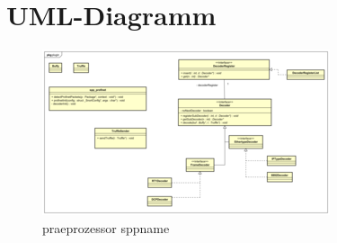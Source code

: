 \section{UML-Diagramm}

\begin{figure}
  \centering
  \includegraphics[width=\paperwidth]{../diagramimages/spp_profinet.png}
  \caption{\gls{praeprozessor} \gls{sppname}}
\end{figure}
